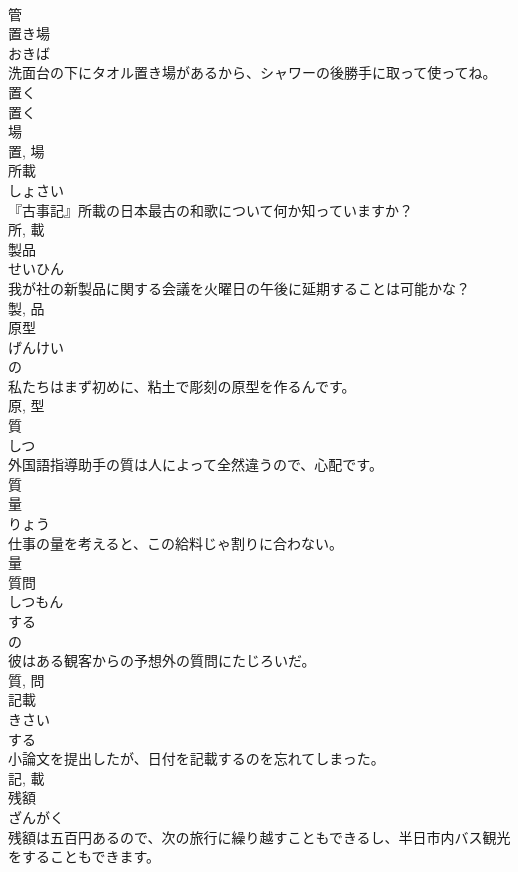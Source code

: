 \documentclass[8pt]{extreport}
\begin{document}
\begin{CJK}{UTF8}{min}
\\	管	
\\	置き場	
\\	おきば	
\\	洗面台の下にタオル置き場があるから、シャワーの後勝手に取って使ってね。	
\\	置く 
\\	置く 
\\	場 
\\	置, 場	
\\	所載	
\\	しょさい	
\\	『古事記』所載の日本最古の和歌について何か知っていますか？	
\\	所, 載	
\\	製品	
\\	せいひん	
\\	我が社の新製品に関する会議を火曜日の午後に延期することは可能かな？	
\\	製, 品	
\\	原型	
\\	げんけい	
\\	の 
\\	私たちはまず初めに、粘土で彫刻の原型を作るんです。	
\\	原, 型	
\\	質	
\\	しつ	
\\	外国語指導助手の質は人によって全然違うので、心配です。	
\\	質	
\\	量	
\\	りょう	
\\	仕事の量を考えると、この給料じゃ割りに合わない。	
\\	量	
\\	質問	
\\	しつもん	
\\	する 
\\	の 
\\	彼はある観客からの予想外の質問にたじろいだ。	
\\	質, 問	
\\	記載	
\\	きさい	
\\	する 
\\	小論文を提出したが、日付を記載するのを忘れてしまった。	
\\	記, 載	
\\	残額	
\\	ざんがく	
\\	残額は五百円あるので、次の旅行に繰り越すこともできるし、半日市内バス観光をすることもできます。	

\end{CJK}
\end{document}
